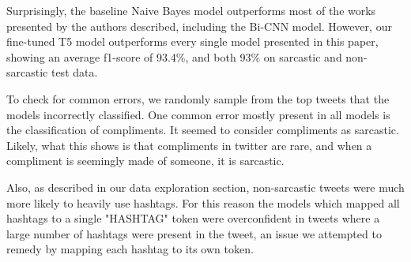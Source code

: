 \documentclass[11pt,a4paper]{article}
\begin{document}
\begin{center}
\end{center}

Surprisingly, the baseline Naive Bayes model outperforms most of the works presented by the authors described, including the Bi-CNN model. However, our fine-tuned T5 model outperforms every single model presented in this paper, showing an average f1-score of 93.4\%, and both 93\% on sarcastic and non-sarcastic test data.

To check for common errors, we randomly sample from the top tweets that the models incorrectly classified. One common error mostly present in all models is the classification of compliments. It seemed to consider compliments as sarcastic. Likely, what this shows is that compliments in twitter are rare, and when a compliment is seemingly made of someone, it is sarcastic. 

Also, as described in our data exploration section, non-sarcastic tweets were much more likely to heavily use hashtags. For this reason the models which mapped all hashtags to a single "HASHTAG" token were overconfident in tweets where a large number of hashtags were present in the tweet, an issue we attempted to remedy by mapping each hashtag to its own token.
\end{document}
